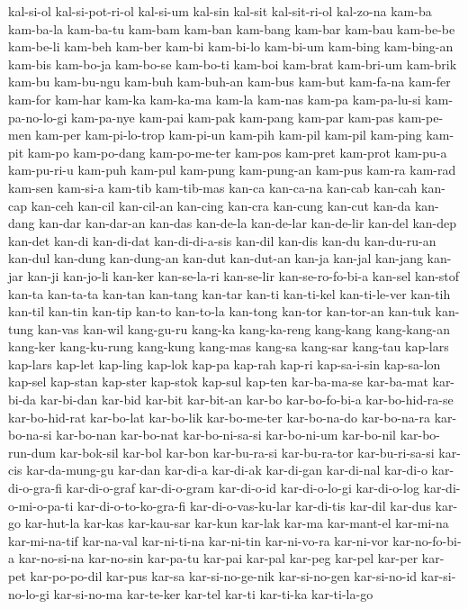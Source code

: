 {kal-si-ol kal-si-pot-ri-ol kal-si-um kal-sin kal-sit kal-sit-ri-ol
kal-zo-na kam-ba kam-ba-la kam-ba-tu kam-bam kam-ban kam-bang kam-bar
kam-bau kam-be-be kam-be-li kam-beh kam-ber kam-bi kam-bi-lo kam-bi-um
kam-bing kam-bing-an kam-bis kam-bo-ja kam-bo-se kam-bo-ti kam-boi
kam-brat kam-bri-um kam-brik kam-bu kam-bu-ngu kam-buh kam-buh-an kam-bus
kam-but kam-fa-na kam-fer kam-for kam-har kam-ka kam-ka-ma kam-la kam-nas
kam-pa kam-pa-lu-si kam-pa-no-lo-gi kam-pa-nye kam-pai kam-pak kam-pang
kam-par kam-pas kam-pe-men kam-per kam-pi-lo-trop kam-pi-un kam-pih
kam-pil kam-pil kam-ping kam-pit kam-po kam-po-dang kam-po-me-ter kam-pos
kam-pret kam-prot kam-pu-a kam-pu-ri-u kam-puh kam-pul kam-pung
kam-pung-an kam-pus kam-ra kam-rad kam-sen kam-si-a kam-tib kam-tib-mas
kan-ca kan-ca-na kan-cab kan-cah kan-cap kan-ceh kan-cil kan-cil-an
kan-cing kan-cra kan-cung kan-cut kan-da kan-dang kan-dar kan-dar-an
kan-das kan-de-la kan-de-lar kan-de-lir kan-del kan-dep kan-det kan-di
kan-di-dat kan-di-di-a-sis kan-dil kan-dis kan-du kan-du-ru-an kan-dul
kan-dung kan-dung-an kan-dut kan-dut-an kan-ja kan-jal kan-jang kan-jar
kan-ji kan-jo-li kan-ker kan-se-la-ri kan-se-lir kan-se-ro-fo-bi-a kan-sel
kan-stof kan-ta kan-ta-ta kan-tan kan-tang kan-tar kan-ti kan-ti-kel
kan-ti-le-ver kan-tih kan-til kan-tin kan-tip kan-to kan-to-la kan-tong
kan-tor kan-tor-an kan-tuk kan-tung kan-vas kan-wil kang-gu-ru kang-ka
kang-ka-reng kang-kang kang-kang-an kang-ker kang-ku-rung kang-kung
kang-mas kang-sa kang-sar kang-tau kap-lars kap-lars kap-let kap-ling
kap-lok kap-pa kap-rah kap-ri kap-sa-i-sin kap-sa-lon kap-sel kap-stan
kap-ster kap-stok kap-sul kap-ten kar-ba-ma-se kar-ba-mat kar-bi-da
kar-bi-dan kar-bid kar-bit kar-bit-an kar-bo kar-bo-fo-bi-a
kar-bo-hid-ra-se kar-bo-hid-rat kar-bo-lat kar-bo-lik kar-bo-me-ter
kar-bo-na-do kar-bo-na-ra kar-bo-na-si kar-bo-nan kar-bo-nat
kar-bo-ni-sa-si kar-bo-ni-um kar-bo-nil kar-bo-run-dum kar-bok-sil kar-bol
kar-bon kar-bu-ra-si kar-bu-ra-tor kar-bu-ri-sa-si kar-cis kar-da-mung-gu
kar-dan kar-di-a kar-di-ak kar-di-gan kar-di-nal kar-di-o kar-di-o-gra-fi
kar-di-o-graf kar-di-o-gram kar-di-o-id kar-di-o-lo-gi kar-di-o-log
kar-di-o-mi-o-pa-ti kar-di-o-to-ko-gra-fi kar-di-o-vas-ku-lar kar-di-tis
kar-dil kar-dus kar-go kar-hut-la kar-kas kar-kau-sar kar-kun kar-lak
kar-ma kar-mant-el kar-mi-na kar-mi-na-tif kar-na-val kar-ni-ti-na
kar-ni-tin kar-ni-vo-ra kar-ni-vor kar-no-fo-bi-a kar-no-si-na kar-no-sin
kar-pa-tu kar-pai kar-pal kar-peg kar-pel kar-per kar-pet kar-po-po-dil
kar-pus kar-sa kar-si-no-ge-nik kar-si-no-gen kar-si-no-id kar-si-no-lo-gi
kar-si-no-ma kar-te-ker kar-tel kar-ti kar-ti-ka kar-ti-la-go
}
